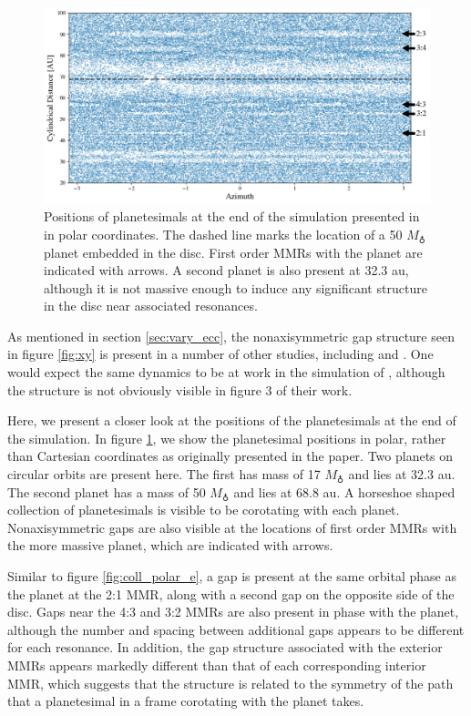 \documentclass[fleqn,usenatbib]{mnras}
\begin{document}
\begin{figure}
    \includegraphics[width=\textwidth]{figures/boley_rtheta.png}
    \caption{Positions of planetesimals at the end of the simulation presented in \citet{2017ApJ...850..103B} in polar coordinates. The dashed line marks the location of a 50 $M_{\earth}$ planet embedded in the disc. First order MMRs with the planet are indicated with arrows. A second planet is also present at 32.3 au, although it is not massive enough to induce any significant structure in the disc near associated resonances.\label{fig:boley_rtheta}}
\end{figure}

As mentioned in section \ref{sec:vary_ecc}, the nonaxisymmetric gap structure seen in figure \ref{fig:xy} is present in a number of other studies,
including \citet{2000Icar..143...45R} and \citet{2016ApJ...818..159T}. One would expect the same dynamics to be at work in the simulation of 
\citet{2017ApJ...850..103B}, although the structure is not obviously visible in figure 3 of their work.

Here, we present a closer look at the positions of the planetesimals at the end of the \citet{2017ApJ...850..103B} simulation. In figure 
\ref{fig:boley_rtheta}, we show the planetesimal positions in polar, rather than Cartesian coordinates as originally presented in the paper. Two planets 
on circular orbits are present here. The first has mass of 17 $M_{\earth}$ and lies at 32.3 au. The second planet has a mass of 50 $M_{\earth}$ 
and lies at 68.8 au. A horseshoe shaped collection of planetesimals is visible to be corotating with each planet. Nonaxisymmetric gaps are also
visible at the locations of first order MMRs with the more massive planet, which are indicated with arrows.

Similar to figure \ref{fig:coll_polar_e}, a gap is present at the same orbital phase as the planet at the 2:1 MMR, along with a second gap on
the opposite side of the disc. Gaps near the 4:3 and 3:2 MMRs are also present in phase with the planet, although the number and spacing between 
additional gaps appears to be different for each resonance. In addition, the gap structure associated with the exterior MMRs appears markedly
different than that of each corresponding interior MMR, which suggests that the structure is related to the symmetry of the path that a planetesimal
in a frame corotating with the planet takes.

\bsp	%
\label{lastpage}
\end{document}
